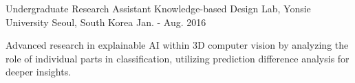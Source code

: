 \begin{cventries}
\cventry
{Undergraduate Research Assistant} %
{Knowledge-based Design Lab, Yonsie University} %
{Seoul, South Korea} %
{Jan. - Aug. 2016} %
{ %
\begin{cvitems}
\item Advanced research in explainable AI within 3D computer vision by analyzing the role of individual parts in classification, utilizing prediction difference analysis for deeper insights.
\end{cvitems}
}



\end{cventries}
